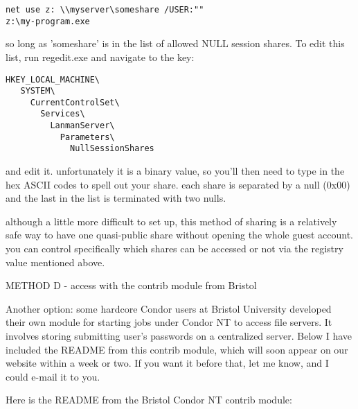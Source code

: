 \begin{verbatim}
net use z: \\myserver\someshare /USER:""
z:\my-program.exe
\end{verbatim}

so long as 'someshare' is in the list of allowed NULL session shares.  To
edit this list, run regedit.exe and navigate to the key:

\begin{verbatim}
HKEY_LOCAL_MACHINE\
   SYSTEM\
     CurrentControlSet\
       Services\
         LanmanServer\
           Parameters\
             NullSessionShares
\end{verbatim}

and edit it.  unfortunately it is a binary value, so you'll then need to
type in the hex ASCII codes to spell out your share.  each share is
separated by a null (0x00) and the last in the list is terminated with
two nulls.

although a little more difficult to set up, this method of sharing is a
relatively safe way to have one quasi-public share without opening the
whole guest account.  you can control specifically which shares can be 
accessed or not via the registry value mentioned above.


METHOD D -  access with the contrib module from Bristol

Another option: some hardcore Condor users at Bristol University developed 
their own module for starting jobs under Condor NT to access file 
servers.  It involves storing submitting user's passwords on a centralized 
server.  Below I have included the README from this contrib module, which 
will soon appear on our website within a week or two.  If you want it 
before that, let me know, and I could e-mail it to you.

Here is the README from the Bristol Condor NT contrib module:

